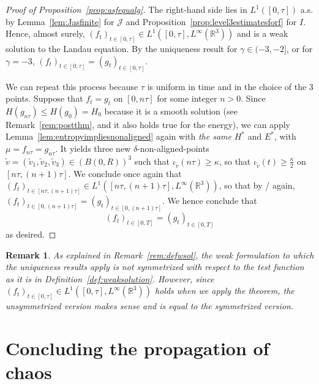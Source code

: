 \documentclass[11pt,a4paper]{article}
\theoremstyle{definition}
\theoremstyle{plain}
\newtheorem{remark}[defi]{Remark}
\begin{document}
\begin{proof}[Proof of Proposition~\ref{prop:asfequalg}]
The right-hand side lies in $L^1([0,\tau])$ a.s. by Lemma~\ref{lem:Jasfinite} for $\mathcal{J}$ and Proposition~\ref{prop:level3estimatesforf} for $I$. Hence, almost surely,
$(f_t)_{t\in[0,\tau]}\in L^1([0,\tau],L^\infty(\mathbb{R}^3))$ and is a weak solution to the Landau equation. By the uniqueness result \cite[Theorem 1.3]{GuerinFournier2008} for $\gamma\in(-3,-2]$, or \cite[Theorem 2]{Fournier2010} for $\gamma=-3$, $(f_t)_{t\in[0,\tau]}=(g_t)_{t\in[0,\tau]}$.

We can repeat this process because $\tau$ is uniform in time and in the choice of the 3 points. Suppose that $f_t=g_t$ on $[0,n\tau]$ for some integer $n>0$. Since $H(g_{n\tau})\leq H(g_0)=H_0$ because it is a smooth solution (see Remark~\ref{rem:postthm}, and it also holds true for the energy), we can apply Lemma~\ref{lem:entropyimpliesnonaligned} again with \textit{the same} $H^*$ and $E^*$, with $\mu=f_{n\tau}=g_{n\tau}$. It yields three new $\delta$-non-aligned-points $\tilde{v}=(\tilde{v}_1,\tilde{v}_2,\tilde{v}_3)\in (B(0,R))^3$ such that
$\iota_{\tilde{v}}({n\tau})\geq \kappa$, so that $\iota_{\tilde{v}}(t)\geq \frac{\kappa}{2}$ on $[n\tau,(n+1)\tau]$. We conclude once again that
$(f_t)_{t\in[n\tau,(n+1)\tau]}\in L^1([n\tau,(n+1)\tau],L^\infty(\mathbb{R}^3))$, so that by \cite[Theorem 1.3]{GuerinFournier2008}/\cite[Theorem 2]{Fournier2010} again, $(f_t)_{t\in[0,(n+1)\tau]}=(g_t)_{t\in[0,(n+1)\tau]}$. We hence conclude that
$$(f_t)_{t\in[0,T]}=(g_t)_{t\in[0,T]}$$ as desired.
\end{proof}

\begin{remark}
    As explained in Remark~\ref{rem:defwsol}, the weak formulation to which the uniqueness results \cite{GuerinFournier2008,Fournier2010} apply is not symmetrized with respect to the test function as it is in Definition~\ref{def:weaksolution}. However, since $(f_t)_{t\in[0,\tau]}\in L^1([0,\tau],L^\infty(\mathbb{R}^3))$ holds when we apply the theorem, the unsymmetrized version makes sense and is equal to the symmetrized version.
\end{remark}


\section{Concluding the propagation of chaos}
\end{document}
